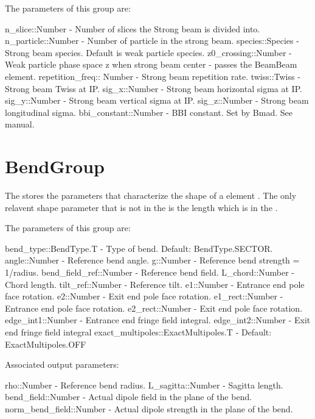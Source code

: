 The parameters of this group are:
\begin{example}
  n_slice::Number           - Number of slices the Strong beam is divided into.
  n_particle::Number        - Number of particle in the strong beam.
  species::Species          - Strong beam species. Default is weak particle species.
  z0_crossing::Number       - Weak particle phase space z when strong beam center
                            -   passes the BeamBeam element.
  repetition_freq:: Number  - Strong beam repetition rate.
  twiss::Twiss              - Strong beam Twiss at IP.
  sig_x::Number             - Strong beam horizontal sigma at IP.
  sig_y::Number             - Strong beam vertical sigma at IP.
  sig_z::Number             - Strong beam longitudinal sigma.
  bbi_constant::Number      - BBI constant. Set by Bmad. See manual.
\end{example}

\section{BendGroup}
\label{s:bend.g}

The  stores the parameters that characterize the shape of a  element
. The only relavent shape parameter that is not in the  is the
length  which is in the .

The parameters of this group are:
\begin{example}
  bend_type::BendType.T     - Type of bend. Default: BendType.SECTOR.
  angle::Number             - Reference bend angle.
  g::Number                 - Reference bend strength = 1/radius.
  bend_field_ref::Number    - Reference bend field.
  L_chord::Number           - Chord length.
  tilt_ref::Number          - Reference tilt.
  e1::Number                - Entrance end pole face rotation.
  e2::Number                - Exit end pole face rotation.
  e1_rect::Number           - Entrance end pole face rotation.
  e2_rect::Number           - Exit end pole face rotation.
  edge_int1::Number         - Entrance end fringe field integral.
  edge_int2::Number         - Exit end fringe field integral
  exact_multipoles::ExactMultipoles.T  - Default: ExactMultipoles.OFF
\end{example}


Associated output parameters:
\begin{example}
  rho::Number             - Reference bend radius.
  L_sagitta::Number       - Sagitta length.
  bend_field::Number      - Actual dipole field in the plane of the bend.
  norm_bend_field::Number - Actual dipole strength in the plane of the bend.
\end{example}

